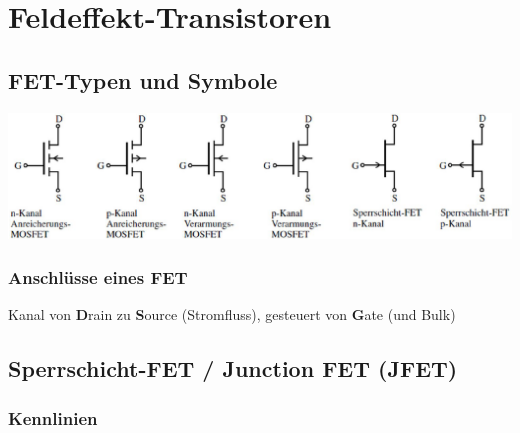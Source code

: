 \section{Feldeffekt-Transistoren}

\subsection{FET-Typen und Symbole}

\includegraphics[align=t, width=\columnwidth]{images/fet_symbole_typen.png}


\subsubsection{Anschlüsse eines FET}

Kanal von \textbf{D}rain zu \textbf{S}ource (Stromfluss), gesteuert von \textbf{G}ate (und Bulk)


\subsection{Sperrschicht-FET / Junction FET (JFET)}

\subsubsection{Kennlinien}

